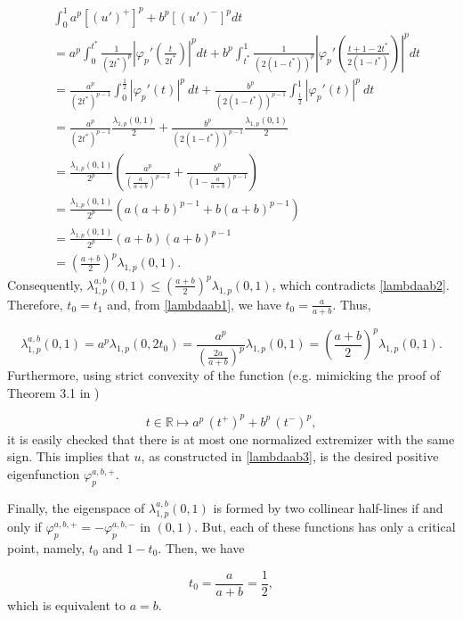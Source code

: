 \documentclass[a4paper,11pt]{article}
\newcommand{\R}{\mathbb{R}}
\begin{document}
{\begin{align*}
& \int_{0}^{1} a^{p} [(u')^{+}]^{p} + b^{p} [(u')^{-}]^{p} dt \\
&= a^{p}\int_{0}^{t^{*}}\frac{1}{(2t^{*})^{p}}\left| \varphi_{p}'\left(\frac{t}{2t^{*}}\right)\right|^{p} dt + b^{p}\int_{t^{*}}^{1}\frac{1}{(2(1-t^{*}))^{p}}\left|\varphi_{p}'\left(\frac{t + 1- 2t^{*}}{2(1-t^{*})}\right)\right|^{p} dt \\
&= \frac{a^{p}}{(2t^{*})^{p-1}}\int_{0}^{\frac{1}{2}} |\varphi_{p}'(t)|^{p}\ dt + \frac{b^{p}}{(2(1-t^{*}))^{p-1}}\int_{\frac{1}{2}}^{1} |\varphi_{p}'(t)|^{p}\ dt \\
&= \frac{a^{p}}{(2t^{*})^{p-1}}\frac{\lambda_{1,p}(0,1)}{2}+\frac{b^{p}}{(2(1-t^{*}))^{p-1}}\frac{\lambda_{1,p}(0,1)}{2} \\
&=\frac{\lambda_{1,p}(0,1)}{2^{p}}\left(\frac{a^{p}}{\left(\frac{a}{a+b}\right)^{p-1}}+\frac{b^{p}}{\left(1-\frac{a}{a+b}\right)^{p-1}}\right)\\
&=\frac{\lambda_{1,p}(0,1)}{2^{p}}\left(a(a+b)^{p-1}+b(a+b)^{p-1}\right)\\
&= \frac{\lambda_{1,p}(0,1)}{2^{p}}(a+b)(a+b)^{p-1} \\
&= \left(\frac{a+b}{2}\right)^{p}\lambda_{1,p}(0,1).
\end{align*}
Consequently, $\lambda_{1,p}^{a,b}(0,1) \leq \left(\frac{a+b}{2}\right)^{p}\lambda_{1,p}(0,1)$, which contradicts \eqref{lambdaab2}. Therefore, $t_{0} = t_{1}$ and, from \eqref{lambdaab1}, we have $t_{0} = \frac{a}{a+b}$. Thus,

\[
\lambda_{1,p}^{a,b}(0,1) = a^p \lambda_{1,p}(0, 2t_0) = \frac{a^{p}}{\left(\frac{2a}{a+b}\right)^{p}}\lambda_{1,p}(0,1) = \left(\frac{a+b}{2}\right)^{p}\lambda_{1,p}(0,1).
\]
Furthermore, using strict convexity of the function (e.g. mimicking the proof of Theorem 3.1 in \cite{BFK})

\[
t \in \R \mapsto a^p\, (t^+)^p + b^p\, (t^-)^p,
\]
it is easily checked that there is at most one normalized extremizer with the same sign. This implies that $u$, as constructed in \eqref{lambdaab3}, is the desired positive eigenfunction $\varphi^{a,b,+}_p$.

Finally, the eigenspace of $\lambda^{a,b}_{1,p}(0,1)$ is formed by two collinear half-lines if and only if $\varphi_{p}^{a,b,+} = - \varphi_{p}^{a,b,-}$ in $(0,1)$. But, each of these functions has only a critical point, namely, $t_0$ and $1 - t_0$. Then, we have

\[
t_0 = \frac{a}{a + b} = \frac{1}{2},
\]
which is equivalent to $a = b$.

}
\end{document}
